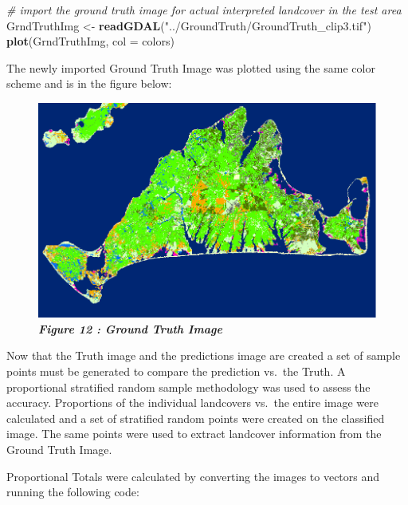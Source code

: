 \documentclass[]{article}
\newenvironment{Shaded}{\begin{snugshade}}{\end{snugshade}}
\newcommand{\KeywordTok}[1]{\textcolor[rgb]{0.13,0.29,0.53}{\textbf{#1}}}
\newcommand{\DataTypeTok}[1]{\textcolor[rgb]{0.13,0.29,0.53}{#1}}
\newcommand{\StringTok}[1]{\textcolor[rgb]{0.31,0.60,0.02}{#1}}
\newcommand{\CommentTok}[1]{\textcolor[rgb]{0.56,0.35,0.01}{\textit{#1}}}
\newcommand{\NormalTok}[1]{#1}
\begin{document}
\begin{Shaded}
\begin{Highlighting}[]
\CommentTok{# import the ground truth image for actual interpreted landcover in the test area}
\NormalTok{GrndTruthImg <-}\StringTok{ }\KeywordTok{readGDAL}\NormalTok{(}\StringTok{"../GroundTruth/GroundTruth_clip3.tif"}\NormalTok{)}
\KeywordTok{plot}\NormalTok{(GrndTruthImg, }\DataTypeTok{col =}\NormalTok{ colors)}
\end{Highlighting}
\end{Shaded}

The newly imported Ground Truth Image was plotted using the same color
scheme and is in the figure below:

\begin{figure}
\centering
\includegraphics{images/GroundTruth.png}
\caption{\textbf{\emph{Figure 12 : Ground Truth Image}}}
\end{figure}

Now that the Truth image and the predictions image are created a set of
sample points must be generated to compare the prediction vs.~the Truth.
A proportional stratified random sample methodology was used to assess
the accuracy. Proportions of the individual landcovers vs.~the entire
image were calculated and a set of stratified random points were created
on the classified image. The same points were used to extract landcover
information from the Ground Truth Image.

Proportional Totals were calculated by converting the images to vectors
and running the following code:
\end{document}
